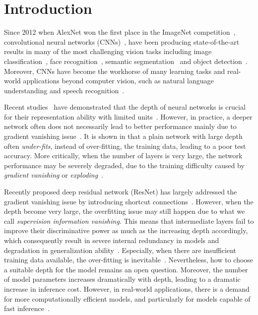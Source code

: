 \documentclass[10pt,onecolumn,letterpaper]{article}
\begin{document}
\section{Introduction} \label{sec:introduction}
Since 2012 when AlexNet won the first place in the ImageNet competition~\cite{krizhevsky2012imagenet}, convolutional neural networks (CNNs)~\cite{lecun1989backpropagation}, have been producing state-of-the-art results in many of the most challenging vision tasks including image classification~\cite{krizhevsky2012imagenet,Lee2015,he2015deep}, face recognition~\cite{schroff2015facenet,sun2015deeply}, semantic segmentation~\cite{long2015fully} and object detection~\cite{ren2015faster,Zagoruyko2016}.
Moreover, CNNs  have become the  workhorse of many learning tasks and real-world applications beyond computer vision, such as natural language understanding and speech recognition~\cite{lecun2015deep}.

Recent studies~\cite{simonyan2014very,srivastava2015training,szegedy2015going,Lee2015} have demonstrated that the depth of neural networks is crucial for their representation ability with limited units~\cite{srivastava2015training}.
However,  in practice, a deeper network often does not necessarily lead to better performance mainly due to gradient vanishing issue~\cite{glorot2010understanding,romero2014fitnets,srivastava2015highway,he2015deep}.
It is shown in \cite{he2015deep} that a plain network with large depth  often {\em under-fits}, instead of over-fitting, the training data, leading to a poor test accuracy.
More critically,  when the number of layers is very large, the network performance  may be severely degraded, due to the training difficulty caused by \emph{gradient vanishing} or \emph{exploding}~\cite{glorot2010understanding,romero2014fitnets,srivastava2015highway,he2015deep}.

Recently proposed deep residual network (ResNet) has largely addressed the gradient vanishing issue by introducing shortcut connections~\cite{he2015deep}. However, when the depth become very large, the overfitting issue may still happen due to what we call \emph{supervision information
vanishing}. This means that intermediate layers fail to improve their discriminative power as much as the increasing depth accordingly, which consequently result in severe internal redundancy in models and degradation in generalization ability~\cite{he2015deep,DBLP:journals/corr/HuangSLSW16}.
Especially, when there are insufficient training data available, the over-fitting is inevitable~\cite{he2015deep}. Nevertheless, how to choose a suitable depth for the model remains an open question. Moreover, the number of model parameters increases dramatically  with depth, leading to a dramatic increase in inference cost. However, in real-world applications, there is a demand for more computationally efficient models, and particularly for models capable of fast inference~\cite{ba2014deep}.
\end{document}
